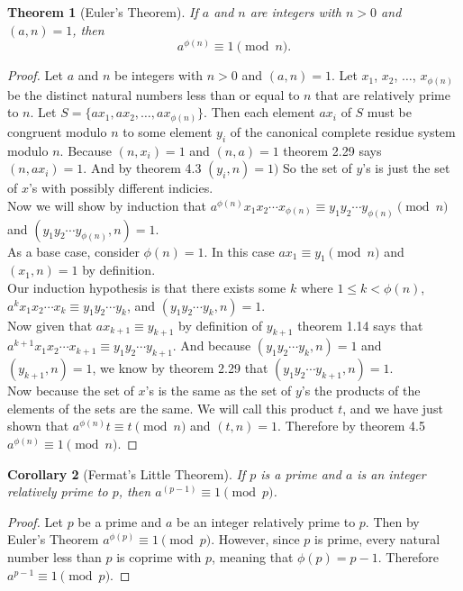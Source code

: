 \documentclass[12pt,leqno]{article}
\numberwithin{equation}{section}
\newtheorem{thm}{Theorem}[section]
\newtheorem{cor}[thm]{Corollary}
\theoremstyle{definition}
\begin{document}
\pagebreak
\begin{thm}[Euler's Theorem]
If $a$ and $n$ are integers with $n > 0$ and $(a, n) = 1$, then \[
a^{\phi(n)} \equiv 1 \pmod{n}. \]
\end{thm}
\begin{proof}[Proof]
Let $a$ and $n$ be integers with $n > 0$ and $(a, n) = 1$.  Let $x_1$, $x_2$, $\hdots$, $x_{\phi(n)}$ be the distinct natural numbers less than or equal to $n$ that are relatively prime to $n$. Let $S = \{ax_1, ax_2, \hdots , ax_{\phi(n)}\}$.  Then each element $ax_i$ of $S$ must be congruent modulo $n$ to some element $y_i$ of the canonical complete residue system modulo $n$.  Because $(n, x_i) = 1$ and $(n, a) = 1$ theorem 2.29 says $(n, ax_i) = 1$.  And by theorem 4.3 $(y_i, n) = 1)$  So the set of $y$'s is just the set of $x$'s with possibly different indicies.\\

Now we will show by induction that $a^{\phi(n)}x_1x_2\cdots x_{\phi(n)} \equiv y_1y_2\cdots y_{\phi(n)} \pmod{n}$ and $(y_1y_2\cdots y_{\phi(n)}, n) = 1$.\\
As a base case, consider $\phi(n) = 1$.  In this case $ax_1 \equiv y_1 \pmod{n}$ and $(x_1, n) = 1$ by definition.\\
Our induction hypothesis is that there exists some $k$ where $1 \leq k < \phi(n)$, \\$a^kx_1x_2\cdots x_k \equiv y_1y_2\cdots y_k$, and $(y_1y_2\cdots y_k, n) = 1$.\\
Now given that $ax_{k+1} \equiv y_{k+1}$ by definition of $y_{k+1}$ theorem 1.14 says that \\$a^{k+1}x_1x_2\cdots x_{k+1} \equiv y_1y_2\cdots y_{k+1}$.  And because $(y_1y_2\cdots y_k, n) = 1$ and $(y_{k+1}, n) = 1$, we know by theorem 2.29 that $(y_1y_2\cdots y_{k+1}, n) = 1$.\\

Now because the set of $x$'s is the same as the set of $y$'s the products of the elements of the sets are the same.  We will call this product $t$, and we have just shown that $a^{\phi(n)}t \equiv t \pmod{n}$ and $(t, n) = 1$.  Therefore by theorem 4.5 $a^{\phi(n)} \equiv 1 \pmod{n}$.
\end{proof}

\begin{cor}[Fermat's Little Theorem]
If $p$ is a prime and $a$ is an integer relatively prime to $p$,
then $a^{(p-1)} \equiv 1 \pmod{p}$.
\end{cor}
\begin{proof}[Proof]
Let $p$ be a prime and $a$ be an integer relatively prime to $p$.  Then by Euler's Theorem $a^{\phi(p)} \equiv 1 \pmod{p}$.  However, since $p$ is prime, every natural number less than $p$ is coprime with $p$, meaning that $\phi(p) = p - 1$.  Therefore $a^{p-1} \equiv 1 \pmod{p}$.
\end{proof}
\end{document}
